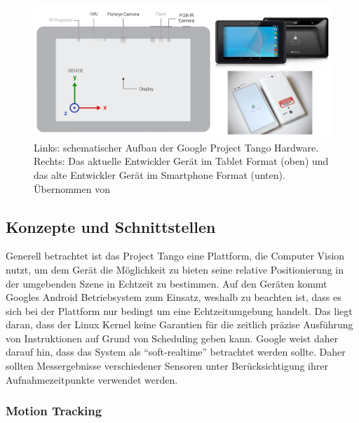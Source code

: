 \begin{figure}[h]
  \centering
	\includegraphics[width=1.0\textwidth]{content/images/theory/tango-device.png} 
  \caption{Links: schematischer Aufbau der Google Project Tango Hardware. Rechts: Das aktuelle Entwickler Gerät im Tablet Format (oben) und das alte Entwickler Gerät im Smartphone Format (unten). Übernommen von \citet{GoogleDevelopers:online}}
  \label{fig:tango-device}
\end{figure}

\subsection{Konzepte und Schnittstellen}

Generell betrachtet ist das Project Tango eine Plattform, die Computer Vision nutzt, um dem Gerät die Möglichkeit zu bieten seine relative Positionierung in der umgebenden Szene in Echtzeit zu bestimmen. Auf den Geräten kommt Googles Android Betriebsystem zum Einsatz, weshalb zu beachten ist, dass es sich bei der Plattform nur bedingt um eine Echtzeitumgebung handelt. Das liegt daran, dass der Linux Kernel keine Garantien für die zeitlich präzise Ausführung von Instruktionen auf Grund von Scheduling geben kann. Google weist daher darauf hin, dass das System als \enquote{soft-realtime} betrachtet werden sollte. Daher sollten Messergebnisse verschiedener Sensoren unter Berücksichtigung ihrer Aufnahmezeitpunkte verwendet werden. \citep{GoogleDevelopersConcepts:online} 

\subsubsection{Motion Tracking}

